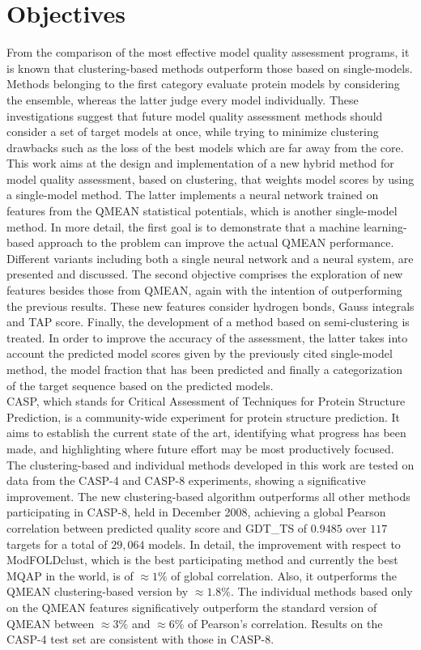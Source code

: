 \section{Objectives}
\label{sec:objectives}
From the comparison of the most effective model quality assessment programs, it is known that clustering-based methods outperform those based on single-models. Methods belonging to the first category evaluate protein models by considering the ensemble, whereas the latter judge every model individually. These investigations suggest that future model quality assessment methods should consider a set of target models at once, while trying to minimize clustering drawbacks such as the loss of the best models which are far away from the core. \\
This work aims at the design and implementation of a new hybrid method for model quality assessment, based on clustering, that weights model scores by using a single-model method. The latter implements a neural network trained on features from the QMEAN statistical potentials, which is another single-model method. In more detail, the first goal is to demonstrate that a machine learning-based approach to the problem can improve the actual QMEAN performance. Different variants including both a single neural network and a neural system, are presented and discussed. The second objective comprises the exploration of new features besides those from QMEAN, again with the intention of outperforming the previous results. These new features consider hydrogen bonds, Gauss integrals and TAP score. Finally, the development of a method based on semi-clustering is treated. In order to improve the accuracy of the assessment, the latter takes into account the predicted model scores given by the previously cited single-model method, the model fraction that has been predicted and finally a categorization of the target sequence based on the predicted models.\\
CASP, which stands for Critical Assessment of Techniques for Protein Structure Prediction, is a community-wide experiment for protein structure prediction. It aims to establish the current state of the art, identifying what progress has been made, and highlighting where future effort may be most productively focused. The clustering-based and individual methods developed in this work are tested on data from the CASP-4 and CASP-8 experiments, showing a significative improvement. The new clustering-based algorithm outperforms all other methods participating in CASP-8, held in December 2008, achieving a global Pearson correlation between predicted quality score and GDT\_TS of $0.9485$ over $117$ targets for a total of $29,064$ models. In detail, the improvement with respect to ModFOLDclust, which is the best participating method and currently the best MQAP in the world, is of $\approx 1\%$ of global correlation. Also, it outperforms the QMEAN clustering-based version by $\approx 1.8\%$. The individual methods based only on the QMEAN features significatively outperform the standard version of QMEAN between $\approx 3\%$ and $\approx 6\%$ of Pearson’s correlation. Results on the CASP-4 test set are consistent with those in CASP-8.


